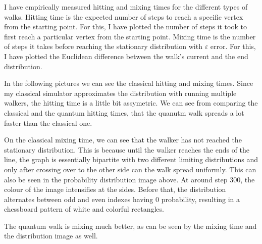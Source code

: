 I have empirically measured hitting and mixing times for the different types of walks. Hitting time
is the expected number of steps to reach a specific vertex from the starting point. For this, I have
plotted the number of steps it took to first reach a particular vertex from the starting point. Mixing
time is the number of steps it takes before reaching the stationary distribution with $\varepsilon$ error. For this, I have plotted the Euclidean difference between the walk's current and the end distribution.

In the following pictures we can see the classical hitting and mixing times. Since my classical simulator
approximates the distribution with running multiple walkers, the hitting time is a little bit assymetric. We can see from comparing the classical and the quantum hitting times, that the quanutm walk spreads a lot faster than the classical one.

On the classical mixing time, we can see that the walker has not reached the stationary distribution. This is because until the walker reaches the ends of the line, the graph is essentially bipartite with two different limiting distributions and only after crossing over to the other side can the walk spread uniformly. This can also be seen in the probability distribution image above. At around step $300$, the colour of the image intensifies at the sides. Before that, the distribution alternates between odd and even indexes having $0$ probability, resulting in a chessboard pattern of white and colorful rectangles.

The quantum walk is mixing much better, as can be seen by the mixing time and the distribution image as well.


